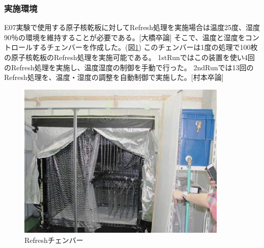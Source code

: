 \documentclass[12pt,a4paper]{jarticle}
\begin{document}
\subsubsection{実施環境}
E07実験で使用する原子核乾板に対してRefresh処理を実施場合は温度25度、湿度90％の環境を維持することが必要である。[大橋卒論]
そこで、温度と湿度をコントロールするチェンバーを作成した。(図\ref{fig:refresh_masi-nn})
このチェンバーは1度の処理で100枚の原子核乾板のRefresh処理を実施可能である。
1stRunではこの装置を使い4回のRefresh処理を実施し、温度湿度の制御を手動で行った。
2ndRunでは13回のRefresh処理を、温度・湿度の調整を自動制御で実施した。[村本卒論]
\begin{figure}[htbp]
  \centering
     \includegraphics[width=100mm]{refresh_chember.png}
  \caption{Refreshチェンバー\label{fig:refresh_masi-nn}}
\end{figure}
\end{document}

